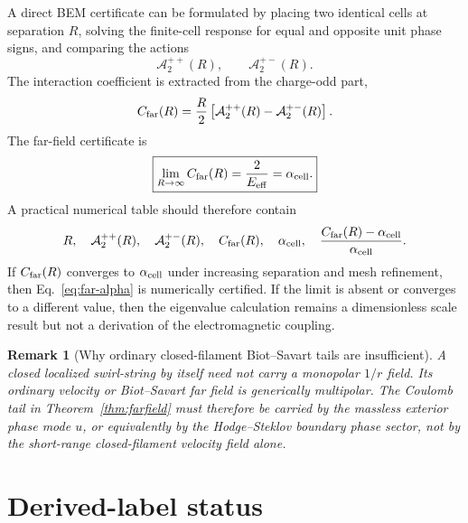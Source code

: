 \documentclass[11pt]{article}
\newcommand{\Eeff}{E_{\rm eff}}
\newcommand{\alphacell}{\alpha_{\rm cell}}
\newcommand{\Cfar}{C_{\rm far}}
\newcommand{\Atwo}{\mathcal A_{2}}
\newtheorem{remark}{Remark}
\begin{document}
A direct BEM certificate can be formulated by placing two identical cells at separation \(R\), solving the finite-cell response for equal and opposite unit phase signs, and comparing the actions
\begin{equation}
\Atwo^{++}(R),
\qquad
\Atwo^{+-}(R).
\end{equation}
The interaction coefficient is extracted from the charge-odd part,
\begin{equation}
\Cfar(R)
=
\frac{R}{2}\left[\Atwo^{++}(R)-\Atwo^{+-}(R)\right].
\label{eq:CfarR}
\end{equation}
The far-field certificate is
\begin{equation}
\boxed{
\lim_{R\to\infty}\Cfar(R)=\frac{2}{\Eeff}=\alphacell.
}
\label{eq:certificate}
\end{equation}
A practical numerical table should therefore contain
\begin{equation}
R,
\quad
\Atwo^{++}(R),
\quad
\Atwo^{+-}(R),
\quad
\Cfar(R),
\quad
\alphacell,
\quad
\frac{\Cfar(R)-\alphacell}{\alphacell}.
\end{equation}
If \(\Cfar(R)\) converges to \(\alphacell\) under increasing separation and mesh refinement, then Eq.~\eqref{eq:far-alpha} is numerically certified. If the limit is absent or converges to a different value, then the eigenvalue calculation remains a dimensionless scale result but not a derivation of the electromagnetic coupling.

\begin{remark}[Why ordinary closed-filament Biot--Savart tails are insufficient]
A closed localized swirl-string by itself need not carry a monopolar \(1/r\) field. Its ordinary velocity or Biot--Savart far field is generically multipolar. The Coulomb tail in Theorem~\ref{thm:farfield} must therefore be carried by the massless exterior phase mode \(u\), or equivalently by the Hodge--Steklov boundary phase sector, not by the short-range closed-filament velocity field alone.
\end{remark}


\section{Derived-label status}
\label{sec:derived-label-status}
\end{document}
